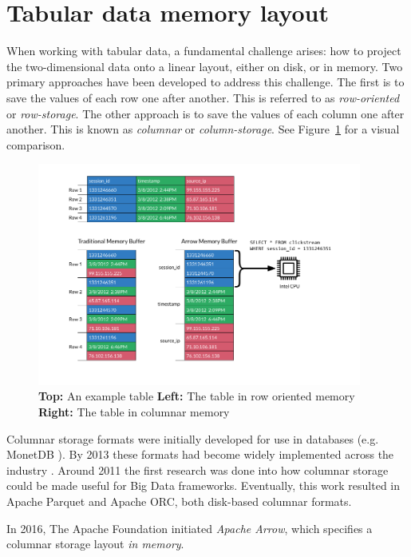 \section{Tabular data memory layout}
\label{section:column_vs_row}
When working with tabular data, a fundamental challenge arises: how to project the two-dimensional data onto a linear layout, either on disk, or in memory.
Two primary approaches have been developed to address this challenge.
The first is to save the values of each row one after another.
This is referred to as \emph{row-oriented} or \emph{row-storage}.
The other approach is to save the values of each column one after another.
This is known as \emph{columnar} or \emph{column-storage}.
See Figure~\ref{fig:row_v_col} for a visual comparison.
\autocite{Floratou2019}
\begin{figure}
	\begin{center}
		\includegraphics[width=0.95\textwidth]{resources/columnar}
	\end{center}
	\caption{\textbf{Top:} An example table \textbf{Left:} The table in row oriented memory \textbf{Right:} The table in columnar memory \autocite{arrow:overview}}
	\label{fig:row_v_col}
\end{figure}

Columnar storage formats were initially developed for use in databases (e.g. MonetDB \autocite{Boncz2002}).
By 2013 these formats had become widely implemented across the industry
\autocite{Abadi2013}.
Around 2011 the first research was done into how columnar storage could be made useful for Big Data frameworks.
Eventually, this work resulted in Apache Parquet and Apache ORC, both disk-based columnar formats.
\autocite{Floratou2019}

In 2016, The Apache Foundation initiated \emph{Apache Arrow}, which specifies a columnar storage layout \emph{in memory}.
\autocite{Ahmad2020}

